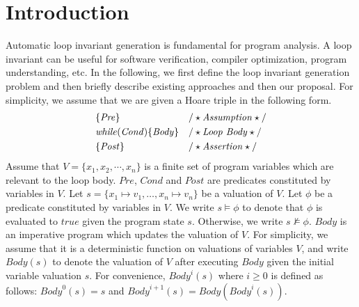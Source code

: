 
\section{Introduction} %
\label{sec:introduction}

Automatic loop invariant generation is fundamental for program analysis. A loop invariant can be useful for software verification, compiler optimization, program understanding, etc. In the following, we first define the loop invariant generation problem and then briefly describe existing approaches and then our proposal. For simplicity, we assume that we are given a Hoare triple in the following form. 
\begin{align*}
&\{\mathit{Pre}\} & & /\star\text{\emph{Assumption}}\star/ \\
&\mathit{while} (\mathit{Cond}) \{ \mathit{Body} \} && /\star\text{\emph{Loop Body}}\star/\\
&\{\mathit{Post}\} & & /\star\text{\emph{Assertion}}\star/
\end{align*}
Assume that $V = \{x_1{,} x_2{,} \cdots{,} x_n\}$ is a finite set of program variables which are relevant to the loop body. $\mathit{Pre}$, $\mathit{Cond}$ and $\mathit{Post}$ are predicates constituted by variables in $V$.
Let $s = \{ x_1 \mapsto v_1, \ldots, x_n \mapsto v_n \}$ be a valuation of $V$. Let $\phi$ be a predicate constituted by variables in $V$. We write $s \models \phi$ to denote that $\phi$ is evaluated to $\mathit{true}$ given the program state $s$. Otherwise, we write $s \not \models \phi$. 
$\mathit{Body}$ is an imperative program which updates the valuation of $V$. For simplicity, we assume that it is a deterministic function on valuations of variables $V$, and write $\mathit{Body}(s)$ to denote the valuation of $V$ after executing $\mathit{Body}$ given the initial variable valuation $s$. For convenience, $\mathit{Body}^i(s)$ where $i \geq 0$ is defined as follows: $\mathit{Body}^0(s) = s$ and $\mathit{Body}^{i+1}(s) = \mathit{Body}(\mathit{Body}^i(s))$.

